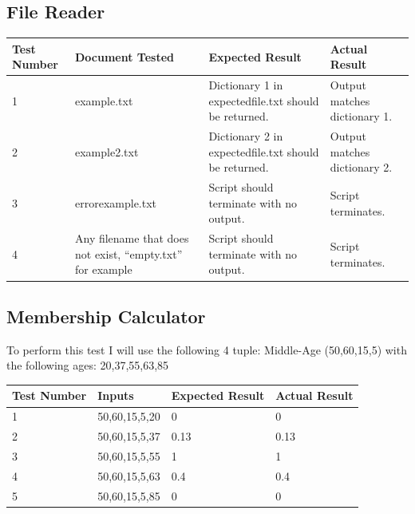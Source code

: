 \documentclass{article}
\begin{document}
\subsection{File Reader}
\begin{center}
 \begin{tabular}{ |p{2cm}|p{3cm}|p{3cm}|p{3cm}|  }
 \hline
 Test Number & Document Tested & Expected Result & Actual Result \\ [0.5ex] 
 \hline\hline
 1 & example.txt & Dictionary 1 in expectedfile.txt should be returned. & Output matches dictionary 1. \\ 
 \hline
 2 & example2.txt & Dictionary 2 in expectedfile.txt should be returned. & Output matches dictionary 2. \\
 \hline
 3 & errorexample.txt & Script should terminate with no output. & Script terminates. \\
 \hline
 4 & Any filename that does not exist, “empty.txt” for example & Script should terminate with no output. & Script terminates. \\
 \hline
\end{tabular}
\end{center}

\subsection{Membership Calculator}
To perform this test I will use the following 4 tuple:  Middle-Age (50,60,15,5) with the following ages: 20,37,55,63,85
\begin{center}
 \begin{tabular}{ |p{2cm}|p{3cm}|p{3cm}|p{3cm}|  }
 \hline
 Test Number & Inputs & Expected Result & Actual Result \\ [0.5ex] 
 \hline\hline
 1 & 50,60,15,5,20 & 0 & 0 \\ 
 \hline
 2 & 50,60,15,5,37 & 0.13 & 0.13 \\
 \hline
 3 & 50,60,15,5,55 & 1 & 1 \\
 \hline
 4 &50,60,15,5,63 & 0.4 & 0.4 \\
 \hline
 5 & 50,60,15,5,85 & 0 & 0 \\
 \hline
\end{tabular}
\end{center}
\end{document}
